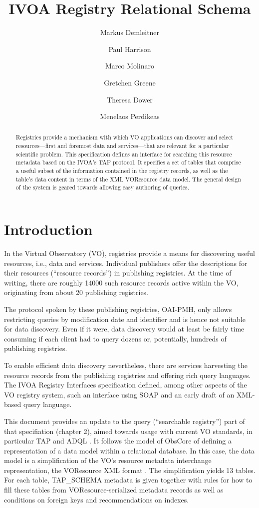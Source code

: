 \documentclass[11pt,a4paper]{ivoa}
\author[http://www.ivoa.net/cgi-bin/twiki/bin/view/IVOA/MarkusDemleitner]{Markus Demleitner}
\author[http://www.ivoa.net/cgi-bin/twiki/bin/view/IVOA/PaulHarrison]{Paul Harrison}
\author[http://www.ivoa.net/cgi-bin/twiki/bin/view/IVOA/MarcoMolinaro]{Marco Molinaro}
\author[http://www.ivoa.net/cgi-bin/twiki/bin/view/IVOA/GretchenGreene]{Gretchen Greene}
\author[http://www.ivoa.net/cgi-bin/twiki/bin/view/IVOA/TheresaDower]{Theresa Dower}
\author[http://wiki.ivoa.net/twiki/bin/view/IVOA/MenelaosPerdikeas]{Menelaos Perdikeas}
\title{IVOA Registry Relational Schema}
\begin{document}
\begin{abstract}
Registries provide a mechanism with which VO applications can
discover and select resources—first and foremost data and
services—that are relevant for a particular scientific problem.
This specification defines  an interface for searching this resource
metadata based on the IVOA's TAP protocol.  It specifies a set of tables
that comprise a useful subset of the information contained in the
registry records, as well as the table's data content in terms of the
XML VOResource data model.  The general design of the system is geared
towards allowing easy authoring of queries.


\end{abstract}




\section{Introduction}

\label{intro}

In the Virtual Observatory (VO), registries provide a means for
discovering useful resources, i.e., data and services.  Individual
publishers offer the descriptions for their resources (``resource
records'') in publishing registries.  At the time of writing, there are
roughly 14000 such resource records active within the VO, originating
from about 20 publishing registries.

The protocol spoken by these
publishing registries, OAI-PMH, only allows restricting queries by
modification date and identifier and is hence not suitable for data discovery.
Even if it were, data discovery would at least be fairly time consuming if
each client had to query dozens or, potentially, hundreds of
publishing registries.

To enable efficient data discovery nevertheless, there are services harvesting the
resource records from the publishing registries and offering rich query
languages.
The IVOA Registry
Interfaces specification \citep{std:RI1} defined, among other aspects of
the VO registry system, such an interface
using SOAP and an early draft of an XML-based query language.

This document provides an update to the query (``searchable registry'') part
of that specifiation (chapter 2), aimed towards
usage with current VO standards, in particular TAP \citep{std:TAP}
and ADQL \citep{std:ADQL}.  It follows the model of ObsCore
\citep{std:OBSCORE} of defining a representation of a data model
within a relational database.  In this case, the data model is a
simplification of the VO's resource metadata interchange representation,
the VOResource XML format \citep{std:VOR}.  The simplification
yields 13 tables.  For each table, TAP\_SCHEMA metadata is given together
with rules for how to fill these tables from VOResource-serialized
metadata records as well as conditions on foreign keys and
recommendations on indexes.
\end{document}
